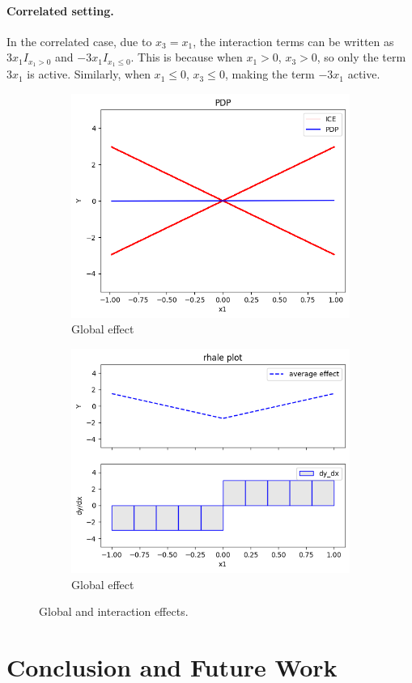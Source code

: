 \documentclass[
twocolumn,
]{ceurart}
\begin{document}
\paragraph{Correlated setting.}

  In the correlated case, due to $x_3=x_1$, the interaction terms can be written as $3x_1I_{x_1>0}$ and $-3x_1I_{x_1 \leq 0}$.
  This is because when $x_1>0$, $x_3>0$, so only the term $3x_1$ is active. Similarly, when $x_1\leq 0$, $x_3 \leq 0$, making the term $-3x_1$ active.

\begin{figure}[t]
    \centering
    \begin{subfigure}[b]{0.49\textwidth}
        \centering
        \includegraphics[width=\textwidth]{figures/simulation_1/cor_global_pdp.png}
        \caption{Global effect}
        \label{subfig:a}
    \end{subfigure}
    \begin{subfigure}[b]{0.49\textwidth}
        \centering
        \includegraphics[width=\textwidth]{figures/simulation_1/cor_global_rhale.png}
        \caption{Global effect}
        \label{subfig:a}
    \end{subfigure}
    \caption{Global and interaction effects.}
    \label{fig:main-concept}
  \end{figure}
  
  
\section{Conclusion and Future Work}


\end{document}
